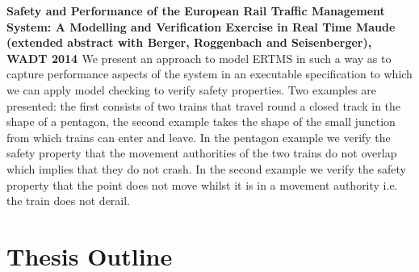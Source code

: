\textbf{Safety and Performance of the European Rail Traffic Management System: A Modelling and Verification Exercise in Real Time Maude (extended abstract with Berger, Roggenbach and Seisenberger), WADT 2014 \cite{AL14c}} We present an approach to model ERTMS in such a way as to capture performance aspects of the system in an executable specification to which we can apply model checking to verify safety properties. Two examples are presented: the first consists of two trains that travel round a closed track in the shape of a pentagon, the second example takes the shape of the small junction from which trains can enter and leave. In the pentagon example we verify the safety property that the movement authorities of the two trains do not overlap which implies that they do not crash. In the second example we verify the safety property that the point does not move whilst it is in a movement authority i.e. the train does not derail.


\section{Thesis Outline}

